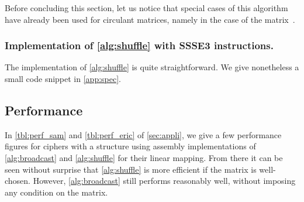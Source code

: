 \medskip

Before concluding this section, let us notice that special cases of this algorithm have already been used for circulant matrices, namely in the case of the \AES{} \mc{} matrix~\cite{vpaes}.

\subsubsection{Implementation of \autoref{alg:shuffle} with SSSE3 instructions.}

The implementation of \autoref{alg:shuffle} is quite straightforward. We give nonetheless a small code snippet in \autoref{app:spec}.

\subsection{Performance}

In \autoref{tbl:perf_sam} and \autoref{tbl:perf_eric} of \autoref{sec:appli}, we give a few performance figures for ciphers with a \shark{} structure using assembly implementations of \autoref{alg:broadcast} and \autoref{alg:shuffle}  for their linear mapping.
From there it can be seen without surprise that \autoref{alg:shuffle} is more efficient if the matrix is well-chosen. However, \autoref{alg:broadcast}
still performs reasonably well, without imposing any condition on the matrix.
